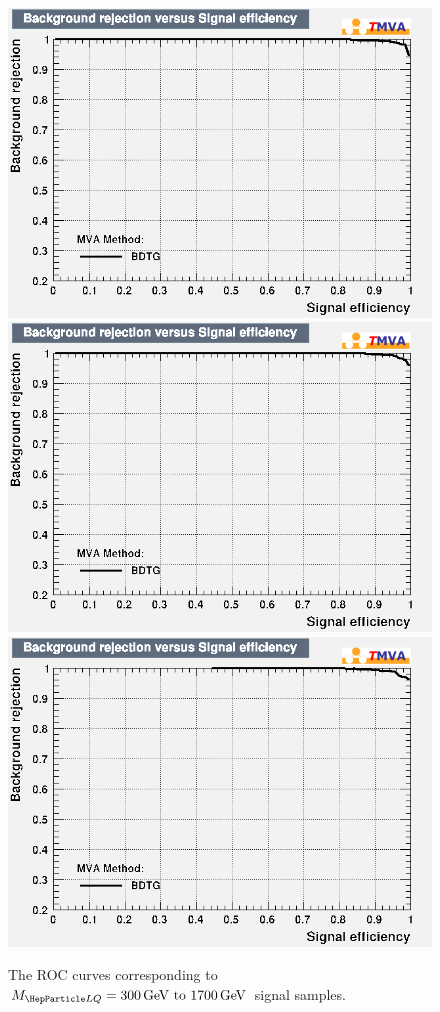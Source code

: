 \begin{figure}[H]
    {\includegraphics[width=.32\textwidth]{Images/Analysis/Results_LQToBMu_pair_uubj_BDTG_FullRun2_2023_01_25_020318/1500/rejBvsS.png}}
    {\includegraphics[width=.32\textwidth]{Images/Analysis/Results_LQToBMu_pair_uubj_BDTG_FullRun2_2023_01_25_020318/1600/rejBvsS.png}}
    {\includegraphics[width=.32\textwidth]{Images/Analysis/Results_LQToBMu_pair_uubj_BDTG_FullRun2_2023_01_25_020318/1700/rejBvsS.png}}
    \caption{The ROC curves corresponding to $\MLQ = \SIrange{300}{1700}{GeV}$ signal samples.}
    \label{figapp:roc1}
\end{figure}

